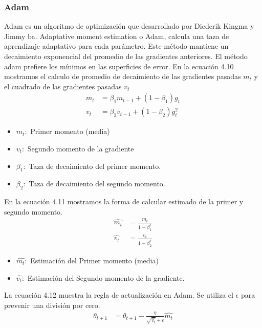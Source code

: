 \subsubsection{Adam	}
Adam es un algoritmo de optimización que desarrollado por Diederik Kingma y Jimmy ba. 
Adaptative moment estimation  o Adam, calcula una taza de aprendizaje adaptativo para cada parámetro. Este método mantiene un decaimiento exponencial del promedio de las gradientes anteriores. El método adam prefiere los mínimos en las superficies de error.
 En la ecuación 4.10 mostramos el calculo de promedio de decaimiento de las gradientes pasadas $m_{t}$ y el cuadrado de las gradientes pasadas $v_{t}$
\begin{equation}
\label{adam1}
\begin{aligned}
m_{t} &= \beta_{1} m_{t-1} +(1-\beta_{1})g_{t} \\
v_{t} &= \beta_{2} v_{t-1} +(1-\beta_{2})g_{t}^2
\end{aligned}
\end{equation}

\begin{itemize}
	\item $m_{t}:$ Primer momento (media)
	\item $v_{t}:$ Segundo momento de la gradiente
	\item $\beta_{1}:$ Taza de decaimiento del primer momento.
	\item $\beta_{2}:$ Taza de decaimiento del segundo momento.
\end{itemize}
En la ecuación 4.11 mostramos la forma de calcular estimado de la primer y segundo momento.
\begin{equation}
\label{adam2}
\begin{aligned}
\hat{m_{t}}&= \frac{m_{t}}{1-\beta_{1}^{t}} \\
\hat{v_{t}} &= \frac{v_{t}}{1-\beta_{2}^{t}}
\end{aligned}
\end{equation}

\begin{itemize}
	\item $\hat{m_{t}}:$ Estimación del Primer momento (media)
	\item $\hat{v_{t}}:$ Estimación del Segundo momento de la gradiente.
\end{itemize}

La ecuación 4.12 muestra la regla de actualización en Adam. Se utiliza el $\epsilon$ para prevenir una división por cero.
\begin{equation}
\label{adam3}
\begin{aligned}
\theta_{t+1}&= \theta_{t+1} - \frac{\eta}{\sqrt{\hat{v_{t}}}+\epsilon} \hat{m_{t}}	
\end{aligned}
\end{equation}

